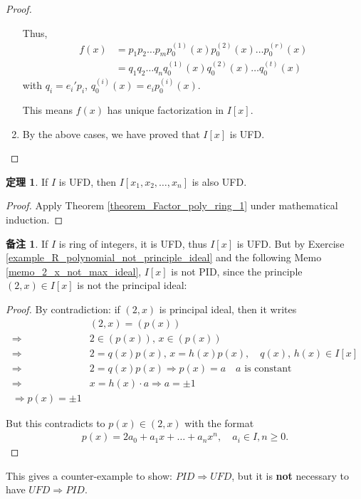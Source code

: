 \documentclass[utf8]{ctexbook}
\theoremstyle{definition}
\newtheorem{prototheorem}{定理}[section]
\newenvironment{theorem}
   {\colorlet{shadecolor}{pink!30}\begin{shaded}\begin{prototheorem}}
   {\end{prototheorem}\end{shaded}}
\newtheorem{memo}{备注}[section]
\begin{document}
\begin{proof}
\begin{enumerate}
{\begin{itemize}
{Thus,
\begin{align*}
f(x) &= p_1 p_2 \ldots p_m p_0 ^{(1)} (x) p_0 ^{(2)} (x) \ldots p_0 ^{(r)} (x)  \\
&= q_1 q_2 \ldots q_n q_0 ^{(1)} (x) q_0 ^{(2)} (x) \ldots q_0 ^{(t)} (x) 
\end{align*}
with $q_i = e_i ' p_i $, $q_0 ^{(i)} (x) = e_i p_0 ^{(i)} (x)$.

This means $f(x)$ has unique factorization in $I[x]$. 
}
\end{itemize}
}
\item{By the above cases, we have proved that $I[x]$ is UFD.}
\end{enumerate}
\end{proof}


\begin{theorem}
\label{theorem_Factor_poly_ring_2}
If $I$ is UFD, then $I[x_1, x_2, \ldots, x_n]$ is also UFD.
\end{theorem}

\begin{proof}
Apply Theorem \ref{theorem_Factor_poly_ring_1} under mathematical induction.
\end{proof}


\begin{memo}
If $I$ is ring of integers, it is UFD, thus $I[x]$ is UFD. But by Exercise \ref{example_R_polynomial_not_principle_ideal} and the following Memo \ref{memo_2_x_not_max_ideal}, $I[x]$ is not PID, since the principle $(2, x) \in I[x]$ is not the principal ideal: 

\begin{proof}

By contradiction: if $(2,x)$ is principal ideal, then it writes
\begin{align*}
& (2,x) = (p(x)) \\
\Longrightarrow & 2 \in (p(x)), \, x \in (p(x)) \\
\Longrightarrow & 2 = q(x) p(x), \, x = h(x) p(x), \quad q(x), \, h(x) \in I[x] \\
\Longrightarrow & 2 = q(x) p(x) \Longrightarrow p(x) = a \quad a \mbox{ is constant} \\
\Longrightarrow & x = h(x) \cdot a \Longrightarrow a = \pm 1 \\
\Longrightarrow p(x) = \pm 1 
\end{align*}

But this contradicts to $p(x) \in (2, x)$ with the format
\begin{align*}
p(x) = 2 a_0 + a_1 x + \ldots + a_n x^n, \quad a_i \in I, n \geq 0 .
\end{align*}

\end{proof}


This gives a counter-example to show: $PID \Longrightarrow UFD$, but it is \textbf{not} necessary to have $UFD \Longrightarrow PID$.
\end{memo}
\end{document}

